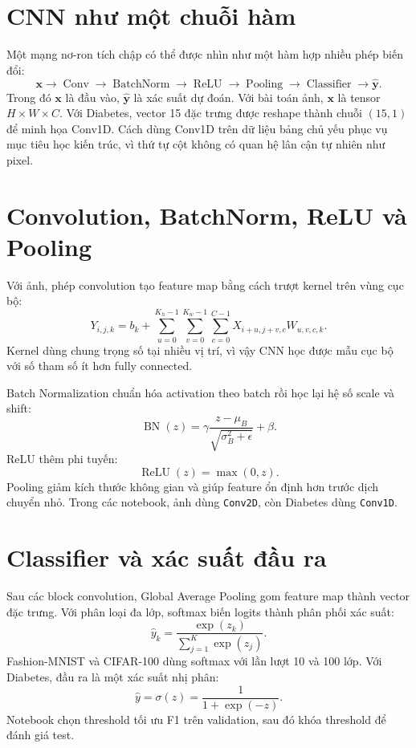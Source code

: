 \documentclass[12pt,a4paper]{report}
\begin{document}
\section{CNN như một chuỗi hàm}
Một mạng nơ-ron tích chập có thể được nhìn như một hàm hợp nhiều phép biến đổi:
\begin{equation}
    \mathbf{x}
    \rightarrow \operatorname{Conv}
    \rightarrow \operatorname{BatchNorm}
    \rightarrow \operatorname{ReLU}
    \rightarrow \operatorname{Pooling}
    \rightarrow \operatorname{Classifier}
    \rightarrow \hat{\mathbf{y}}.
\end{equation}
Trong đó $\mathbf{x}$ là đầu vào, $\hat{\mathbf{y}}$ là xác suất dự đoán.
Với bài toán ảnh, $\mathbf{x}$ là tensor $H\times W\times C$.
Với Diabetes, vector 15 đặc trưng được reshape thành chuỗi $(15,1)$ để minh họa Conv1D.
Cách dùng Conv1D trên dữ liệu bảng chủ yếu phục vụ mục tiêu học kiến trúc, vì thứ tự cột không có quan hệ lân cận tự nhiên như pixel.

\section{Convolution, BatchNorm, ReLU và Pooling}
Với ảnh, phép convolution tạo feature map bằng cách trượt kernel trên vùng cục bộ:
\begin{equation}
Y_{i,j,k}=b_k+
\sum_{u=0}^{K_h-1}
\sum_{v=0}^{K_w-1}
\sum_{c=0}^{C-1}
X_{i+u,j+v,c}W_{u,v,c,k}.
\end{equation}
Kernel dùng chung trọng số tại nhiều vị trí, vì vậy CNN học được mẫu cục bộ với số tham số ít hơn fully connected.

Batch Normalization chuẩn hóa activation theo batch rồi học lại hệ số scale và shift:
\begin{equation}
    \operatorname{BN}(z)=\gamma\frac{z-\mu_B}{\sqrt{\sigma_B^2+\epsilon}}+\beta.
\end{equation}
ReLU thêm phi tuyến:
\begin{equation}
    \operatorname{ReLU}(z)=\max(0,z).
\end{equation}
Pooling giảm kích thước không gian và giúp feature ổn định hơn trước dịch chuyển nhỏ.
Trong các notebook, ảnh dùng \texttt{Conv2D}, còn Diabetes dùng \texttt{Conv1D}.

\section{Classifier và xác suất đầu ra}
Sau các block convolution, Global Average Pooling gom feature map thành vector đặc trưng.
Với phân loại đa lớp, softmax biến logits thành phân phối xác suất:
\begin{equation}
    \hat{y}_k=\frac{\exp(z_k)}{\sum_{j=1}^{K}\exp(z_j)}.
\end{equation}
Fashion-MNIST và CIFAR-100 dùng softmax với lần lượt 10 và 100 lớp.
Với Diabetes, đầu ra là một xác suất nhị phân:
\begin{equation}
    \hat{y}=\sigma(z)=\frac{1}{1+\exp(-z)}.
\end{equation}
Notebook chọn threshold tối ưu F1 trên validation, sau đó khóa threshold để đánh giá test.
\end{document}
